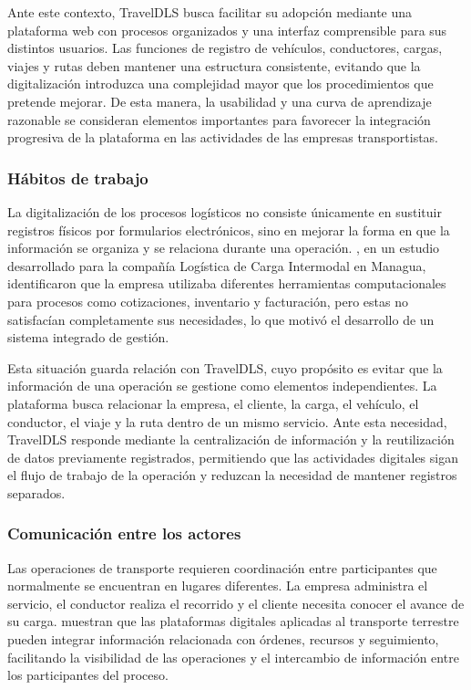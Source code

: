 Ante este contexto, TravelDLS busca facilitar su adopción mediante una plataforma web con procesos organizados y una interfaz comprensible para sus distintos usuarios. Las funciones de registro de vehículos, conductores, cargas, viajes y rutas deben mantener una estructura consistente, evitando que la digitalización introduzca una complejidad mayor que los procedimientos que pretende mejorar. De esta manera, la usabilidad y una curva de aprendizaje razonable se consideran elementos importantes para favorecer la integración progresiva de la plataforma en las actividades de las empresas transportistas.

\subsubsection{Hábitos de trabajo}
\label{sec:habitos-trabajo}

La digitalización de los procesos logísticos no consiste únicamente en sustituir registros físicos por formularios electrónicos, sino en mejorar la forma en que la información se organiza y se relaciona durante una operación. \textcite{aleman2021sistema}, en un estudio desarrollado para la compañía Logística de Carga Intermodal en Managua, identificaron que la empresa utilizaba diferentes herramientas computacionales para procesos como cotizaciones, inventario y facturación, pero estas no satisfacían completamente sus necesidades, lo que motivó el desarrollo de un sistema integrado de gestión.

Esta situación guarda relación con TravelDLS, cuyo propósito es evitar que la información de una operación se gestione como elementos independientes. La plataforma busca relacionar la empresa, el cliente, la carga, el vehículo, el conductor, el viaje y la ruta dentro de un mismo servicio. Ante esta necesidad, TravelDLS responde mediante la centralización de información y la reutilización de datos previamente registrados, permitiendo que las actividades digitales sigan el flujo de trabajo de la operación y reduzcan la necesidad de mantener registros separados.

\subsubsection{Comunicación entre los actores}
\label{sec:comunicacion-actores}

Las operaciones de transporte requieren coordinación entre participantes que normalmente se encuentran en lugares diferentes. La empresa administra el servicio, el conductor realiza el recorrido y el cliente necesita conocer el avance de su carga. \textcite{heinbach2022datadriven} muestran que las plataformas digitales aplicadas al transporte terrestre pueden integrar información relacionada con órdenes, recursos y seguimiento, facilitando la visibilidad de las operaciones y el intercambio de información entre los participantes del proceso.

